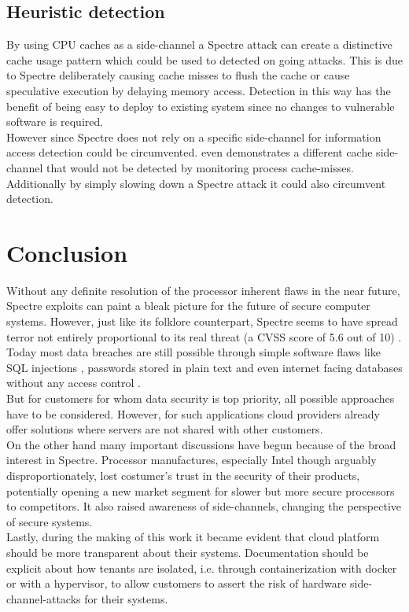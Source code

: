 \documentclass[conference,compsoc,final,a4paper]{IEEEtran}
\begin{document}
\subsection{Heuristic detection}
By using CPU caches as a side-channel a Spectre attack can create a distinctive cache usage pattern which could be used to detected on going attacks. \cite{depoix2018}
This is due to Spectre deliberately causing cache misses to flush the cache or cause speculative execution by delaying memory access. Detection in this way has the
benefit of being easy to deploy to existing system since no changes to vulnerable software is required. \cite{depoix2018, chiappetta2016real} \\
However since Spectre does not rely on a specific side-channel for information access \cite{kocher2018spectre} detection could be circumvented. \textcite{gruss2016flush+}
even demonstrates a different cache side-channel that would not be detected by monitoring process cache-misses. \\
Additionally by simply slowing down a Spectre attack it could also circumvent detection. \cite{chiappetta2016real}
\section{Conclusion}
Without any definite resolution of the processor inherent flaws in the near future, Spectre exploits can paint a bleak picture for the future of secure computer systems. However, just like its folklore counterpart, Spectre seems to have spread terror not entirely proportional to its real threat (a \ac{CVSS} score of 5.6 out of 10) \cite{cveSpectre}. \\
Today most data breaches are still possible through simple software flaws like SQL injections \cite{magnetoSQLi}, passwords stored in plain text \cite{facebookPlainText} and even internet facing databases without any access control \cite{unistellarMongoDB}. \\
But for customers for whom data security is top priority, all possible approaches have to be considered. However, for such applications cloud providers already offer solutions where servers are not shared with other customers. \cite{AWSDedicated} \\
On the other hand many important discussions have begun because of the broad interest in Spectre. Processor manufactures, especially Intel though arguably disproportionately, lost costumer's trust in the security of their products, potentially opening a new market segment for slower but more secure processors to competitors. It also raised awareness of side-channels, changing the perspective of secure systems. \\
Lastly, during the making of this work it became evident that cloud platform should be more transparent about their systems. Documentation should be explicit about how tenants are isolated, i.e. through containerization with docker or with a hypervisor, to allow customers to assert the risk of hardware side-channel-attacks for their systems.
\end{document}
